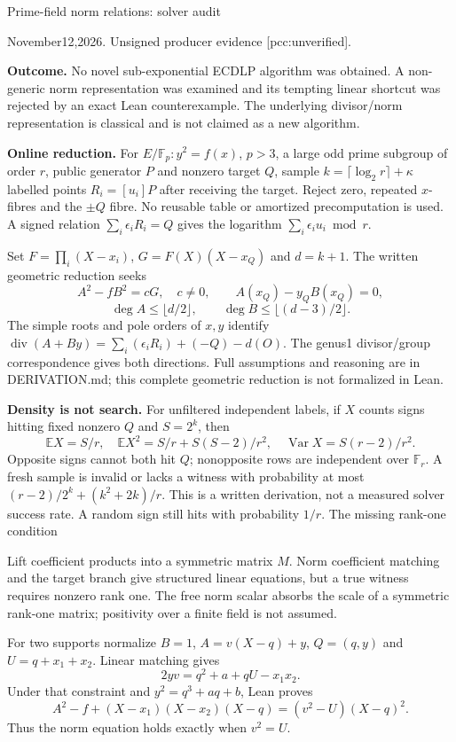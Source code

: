 \documentclass[11pt]{article}
\begin{document}
{\LARGE Prime-field norm relations: solver audit}\par
November12,2026. Unsigned producer evidence [pcc:unverified].

\textbf{Outcome.} No novel sub-exponential ECDLP algorithm was obtained.
A non-generic norm representation was examined and its tempting linear shortcut
was rejected by an exact Lean counterexample. The underlying divisor/norm
representation is classical and is not claimed as a new algorithm.

\textbf{Online reduction.} For $E/\mathbb F_p:y^2=f(x)$, $p>3$, a large
odd prime subgroup of order $r$, public generator $P$ and nonzero target $Q$,
sample $k=\lceil\log_2r\rceil+\kappa$ labelled points $R_i=[u_i]P$ after
receiving the target. Reject zero, repeated $x$-fibres and the $\pm Q$ fibre.
No reusable table or amortized precomputation is used.
A signed relation $\sum_i\epsilon_iR_i=Q$ gives the logarithm
$\sum_i\epsilon_i u_i\bmod r$.

Set $F=\prod_i(X-x_i)$, $G=F(X)(X-x_Q)$ and $d=k+1$. The written geometric
reduction seeks
\[
 A^2-fB^2=cG,\quad c\ne0,\qquad A(x_Q)-y_QB(x_Q)=0,
\]
\[
 \deg A\leq\lfloor d/2\rfloor,\qquad
 \deg B\leq\lfloor(d-3)/2\rfloor.
\]
The simple roots and pole orders of $x,y$ identify
$\operatorname{div}(A+By)=\sum_i(\epsilon_iR_i)+(-Q)-d(O)$.
The genus1 divisor/group correspondence gives both directions. Full assumptions
and reasoning are in DERIVATION.md; this complete geometric reduction is not
formalized in Lean.

\textbf{Density is not search.} For unfiltered independent labels, if $X$
counts signs hitting fixed nonzero $Q$ and $S=2^k$, then
\[
 \mathbb E X=S/r,\quad\mathbb E X^2=S/r+S(S-2)/r^2,
 \quad\operatorname{Var}X=S(r-2)/r^2.
\]
Opposite signs cannot both hit $Q$; nonopposite rows are independent over
$\mathbb F_r$. A fresh sample is invalid or lacks a witness with probability
at most $(r-2)/2^k+(k^2+2k)/r$. This is a written derivation, not a measured
solver success rate. A random sign still hits with probability $1/r$.
\newpage
{\Large The missing rank-one condition}\par
Lift coefficient products into a symmetric matrix $M$. Norm coefficient
matching and the target branch give structured linear equations, but a true
witness requires nonzero rank one. The free norm scalar absorbs the scale of
a symmetric rank-one matrix; positivity over a finite field is not assumed.

For two supports normalize $B=1$, $A=v(X-q)+y$, $Q=(q,y)$ and
$U=q+x_1+x_2$. Linear matching gives
\[
 2yv=q^2+a+qU-x_1x_2.
\]
Under that constraint and $y^2=q^3+aq+b$, Lean proves
\[
 A^2-f+(X-x_1)(X-x_2)(X-q)=(v^2-U)(X-q)^2.
\]
Thus the norm equation holds exactly when $v^2=U$.
\end{document}
